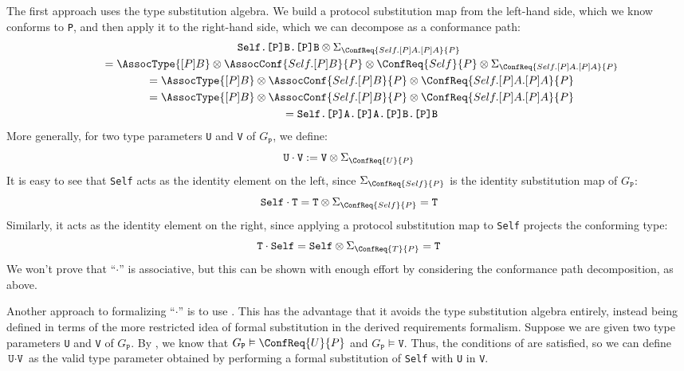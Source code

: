 \documentclass[../generics]{subfiles}
\begin{document}
The first approach uses the type substitution algebra. We build a protocol substitution map from the left-hand side, which we know conforms to \texttt{P}, and then apply it to the right-hand side, which we can decompose as a conformance path:
\begin{gather*}
\texttt{Self.[P]B.[P]B}\otimes\Sigma_{\ConfReq{Self.[P]A.[P]A}{P}}\\
\qquad {} = \AssocType{[P]B} \otimes \AssocConf{Self.[P]B}{P} \otimes \ConfReq{Self}{P} \otimes \Sigma_{\ConfReq{Self.[P]A.[P]A}{P}}\\
\qquad {} = \AssocType{[P]B} \otimes \AssocConf{Self.[P]B}{P} \otimes \ConfReq{Self.[P]A.[P]A}{P}\\
\qquad {} = \AssocType{[P]B} \otimes \AssocConf{Self.[P]B}{P} \otimes \ConfReq{Self.[P]A.[P]A}{P}\\
\qquad {} = \texttt{Self.[P]A.[P]A.[P]B.[P]B}
\end{gather*}
More generally, for two type parameters \texttt{U} and \texttt{V} of $G_\texttt{P}$, we define:
\[\texttt{U}\cdot\texttt{V}:=\texttt{V}\otimes\Sigma_{\ConfReq{U}{P}}\]
It is easy to see that \texttt{Self} acts as the identity element on the left, since $\Sigma_{\ConfReq{Self}{P}}$ is the identity substitution map of $G_\texttt{P}$:
\[
\texttt{Self}\cdot\texttt{T} = \texttt{T}\otimes\Sigma_{\ConfReq{Self}{P}} = \texttt{T}
\]
Similarly, it acts as the identity element on the right, since applying a protocol substitution map to \texttt{Self} projects the conforming type:
\[
\texttt{T}\cdot\texttt{Self} = \texttt{Self}\otimes\Sigma_{\ConfReq{T}{P}} = \texttt{T}
\]
We won't prove that ``$\cdot$'' is associative, but this can be shown with enough effort by considering the conformance path decomposition, as above.

Another approach to formalizing ``$\cdot$'' is to use . This has the advantage that it avoids the type substitution algebra entirely, instead being defined in terms of the more restricted idea of formal substitution in the derived requirements formalism. Suppose we are given two type parameters \texttt{U} and \texttt{V} of $G_\texttt{P}$. By , we know that $G_\texttt{P}\vDash\ConfReq{U}{P}$ and $G_\texttt{P}\vDash\texttt{V}$. Thus, the conditions of  are satisfied, so we can define $\texttt{U}\cdot\texttt{V}$ as the valid type parameter obtained by performing a formal substitution of \texttt{Self} with \texttt{U} in \texttt{V}.
\end{document}

